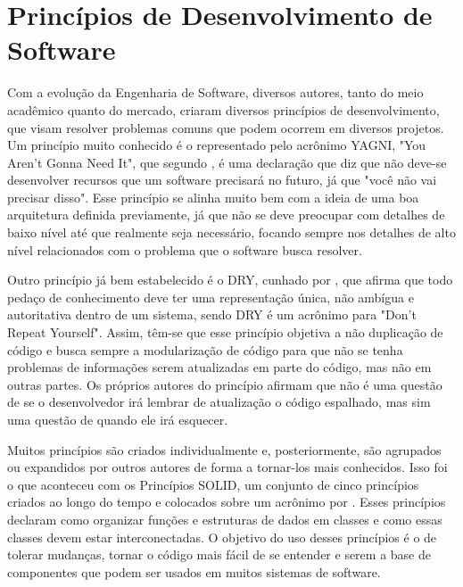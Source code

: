 \documentclass[12pt, %
openright, 
oneside, %
a4paper,    %
brazil]{facom-ufu-abntex2}
\begin{document}
\section{Princípios de Desenvolvimento de Software}
Com a evolução da Engenharia de Software, diversos autores, tanto do meio acadêmico quanto do mercado, criaram diversos princípios de desenvolvimento, que visam resolver problemas comuns que podem ocorrem em diversos projetos. Um princípio muito conhecido é o representado pelo acrônimo YAGNI, "You Aren't Gonna Need It", que segundo , é uma declaração que diz que não deve-se desenvolver recursos que um software precisará no futuro, já que "você não vai precisar disso". Esse princípio se alinha muito bem com a ideia de uma boa arquitetura definida previamente, já que não se deve preocupar com detalhes de baixo nível até que realmente seja necessário, focando sempre nos detalhes de alto nível relacionados com o problema que o software busca resolver.

Outro princípio já bem estabelecido é o DRY, cunhado por , que afirma que todo pedaço de conhecimento deve ter uma representação única, não ambígua e autoritativa dentro de um sistema, sendo DRY é um acrônimo para "Don't Repeat Yourself". Assim, têm-se que esse princípio objetiva a não duplicação de código e busca sempre a modularização de código para que não se tenha problemas de informações serem atualizadas em parte do código, mas não em outras partes. Os próprios autores do princípio afirmam que não é uma questão de se o desenvolvedor irá lembrar de atualização o código espalhado, mas sim uma questão de quando ele irá esquecer.

Muitos princípios são criados individualmente e, posteriormente, são agrupados ou expandidos por outros autores de forma a tornar-los mais conhecidos. Isso foi o que aconteceu com os Princípios SOLID, um conjunto de cinco princípios criados ao longo do tempo e colocados sobre um acrônimo por . Esses princípios declaram como organizar funções e estruturas de dados em classes e como essas classes devem estar interconectadas. O objetivo do uso desses princípios é o de tolerar mudanças, tornar o código mais fácil de se entender e serem a base de componentes que podem ser usados em muitos sistemas de software.
\end{document}
